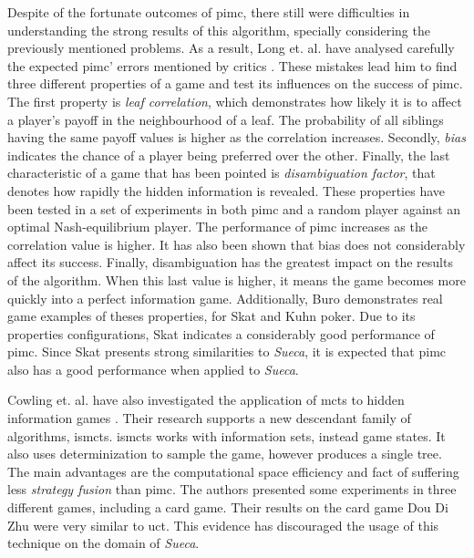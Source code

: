 Despite of the fortunate outcomes of \gls{pimc}, there still were difficulties in understanding the strong results of this algorithm, specially considering the previously mentioned problems.
As a result, Long et. al. have analysed carefully the expected \gls{pimc}' errors mentioned by critics \cite{Long2010}.
These mistakes lead him to find three different properties of a game and test its influences on the success of \gls{pimc}.
The first property is \emph{leaf correlation}, which demonstrates how likely it is to affect a player's payoff in the neighbourhood of a leaf.
The probability of all siblings having the same payoff values is higher as the correlation increases.
Secondly, \emph{bias} indicates the chance of a player being preferred over the other.
Finally, the last characteristic of a game that has been pointed is \emph{disambiguation factor}, that denotes how rapidly the hidden information is revealed.
These properties have been tested in a set of experiments in both \gls{pimc} and a random player against an optimal Nash-equilibrium player.
The performance of \gls{pimc} increases as the correlation value is higher.
It has also been shown that bias does not considerably affect its success.
Finally, disambiguation has the greatest impact on the results of the algorithm.
When this last value is higher, it means the game becomes more quickly into a perfect information game.
Additionally, Buro demonstrates real game examples of theses properties, for Skat and Kuhn poker.
Due to its properties configurations, Skat indicates a considerably good performance of \gls{pimc}.
Since Skat presents strong similarities to \emph{Sueca}, it is expected that \gls{pimc} also has a good performance when applied to \emph{Sueca}.


Cowling et. al. have also investigated the application of \gls{mcts} to hidden information games \cite{Cowling2012}.
Their research supports a new descendant family of algorithms, \gls{ismcts}.
\gls{ismcts} works with information sets, instead game states.
It also uses determinization to sample the game, however produces a single tree.
The main advantages are the computational space efficiency and fact of suffering less \emph{strategy fusion} than \gls{pimc}.
The authors presented some experiments in three different games, including a card game.
Their results on the card game Dou Di Zhu were very similar to \gls{uct}.
This evidence has discouraged the usage of this technique on the domain of \emph{Sueca}.


